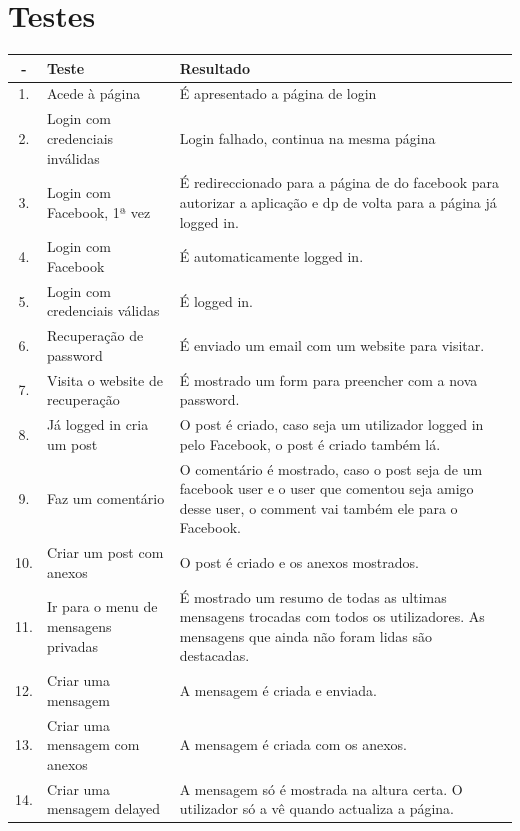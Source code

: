 \documentclass[a4paper, 12pt]{article}
\begin{document}
\section{Testes}
\begin{center}
    \begin{tabular}{| c | p{5cm} | p{9cm} |} \hline
        \-- &   \textbf{Teste}                          &   \textbf{Resultado}\\ \hline
        1.  &   Acede à página                          &   É apresentado a página de login\\ \hline
        2.  &   Login com credenciais inválidas         &   Login falhado, continua na mesma página\\ \hline
        3.  &   Login com Facebook, 1ª vez              &   É redireccionado para a página de do facebook para autorizar a aplicação e dp de volta para a página já logged in.\\ \hline
        4.  &   Login com Facebook                      &   É automaticamente logged in.\\ \hline
        5.  &   Login com credenciais válidas           &   É logged in.\\ \hline
        6.  &   Recuperação de password                 &   É enviado um email com um website para visitar.\\ \hline
        7.  &   Visita o website de recuperação         &   É mostrado um form para preencher com a nova password.\\ \hline
        8.  &   Já logged in cria um post               &   O post é criado, caso seja um utilizador logged in pelo Facebook, o post é criado também lá.\\ \hline
        9.  &   Faz um comentário                       &   O comentário é mostrado, caso o post seja de um facebook user e o user que comentou seja amigo desse user, o comment vai também ele para o Facebook.\\ \hline
        10. &   Criar um post com anexos                &   O post é criado e os anexos mostrados.\\ \hline
        11. &   Ir para o menu de mensagens privadas    &   É mostrado um resumo de todas as ultimas mensagens trocadas com todos os utilizadores. As mensagens que ainda não foram lidas são destacadas.\\ \hline
        12. &   Criar uma mensagem                      &   A mensagem é criada e enviada.\\ \hline
        13. &   Criar uma mensagem com anexos           &   A mensagem é criada com os anexos.\\ \hline
        14. &   Criar uma mensagem delayed              &   A mensagem só é mostrada na altura certa. O utilizador só a vê quando actualiza a página.\\ \hline
    \end{tabular}
\end{center}
\end{document}
